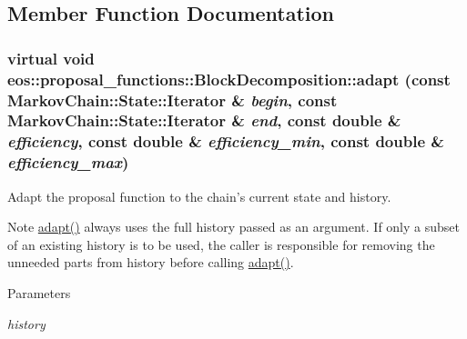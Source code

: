 \subsection{Member Function Documentation}
\hypertarget{classeos_1_1proposal__functions_1_1BlockDecomposition_a045b459bc8314548abe3e5766134e625}{
\subsubsection[{adapt}]{\setlength{\rightskip}{0pt plus 5cm}virtual void eos::proposal\_\-functions::BlockDecomposition::adapt (const {\bf MarkovChain::State::Iterator} \& {\em begin}, \/  const {\bf MarkovChain::State::Iterator} \& {\em end}, \/  const double \& {\em efficiency}, \/  const double \& {\em efficiency\_\-min}, \/  const double \& {\em efficiency\_\-max})}}
\label{classeos_1_1proposal__functions_1_1BlockDecomposition_a045b459bc8314548abe3e5766134e625}
Adapt the proposal function to the chain's current state and history. \begin{DoxyNote}{Note}
\hyperlink{classeos_1_1proposal__functions_1_1BlockDecomposition_a045b459bc8314548abe3e5766134e625}{adapt()} always uses the full history passed as an argument. If only a subset of an existing history is to be used, the caller is responsible for removing the unneeded parts from history before calling \hyperlink{classeos_1_1proposal__functions_1_1BlockDecomposition_a045b459bc8314548abe3e5766134e625}{adapt()}. 
\end{DoxyNote}

\begin{DoxyParams}{Parameters}
\item[{\em history}]\end{DoxyParams}


